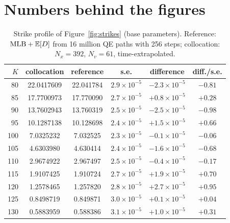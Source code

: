 \section{Numbers behind the figures}\label{app:tables}

\begin{table}[h]
\centering
\caption{Strike profile of Figure~\ref{fig:strikes} (base parameters). Reference: $\mathrm{MLB}+\mathbb{E}[D]$ from
16 million QE paths with 256 steps; collocation: $N_x=392$, $N_v=61$, time-extrapolated.}
\label{tab:strikes}
\small
\begin{tabular}{rccccc}
\toprule
$K$ & collocation & reference & s.e. & difference & diff./s.e.\\
\midrule
80 & 22.0417609 & 22.041784 & $2.9\times10^{-5}$ & $-2.3\times10^{-5}$ & $-0.81$\\
85 & 17.7700973 & 17.770090 & $2.7\times10^{-5}$ & $+0.8\times10^{-5}$ & $+0.28$\\
90 & 13.7602943 & 13.760319 & $2.5\times10^{-5}$ & $-2.5\times10^{-5}$ & $-0.98$\\
95 & 10.1287138 & 10.128698 & $2.4\times10^{-5}$ & $+1.5\times10^{-5}$ & $+0.66$\\
100 & 7.0325232 & 7.032525 & $2.3\times10^{-5}$ & $-0.1\times10^{-5}$ & $-0.06$\\
105 & 4.6303980 & 4.630414 & $2.4\times10^{-5}$ & $-1.6\times10^{-5}$ & $-0.68$\\
110 & 2.9674922 & 2.967497 & $2.5\times10^{-5}$ & $-0.4\times10^{-5}$ & $-0.17$\\
115 & 1.9107425 & 1.910724 & $2.7\times10^{-5}$ & $+1.9\times10^{-5}$ & $+0.70$\\
120 & 1.2578465 & 1.257820 & $2.8\times10^{-5}$ & $+2.7\times10^{-5}$ & $+0.95$\\
125 & 0.8498719 & 0.849871 & $3.0\times10^{-5}$ & $+0.1\times10^{-5}$ & $+0.04$\\
130 & 0.5883959 & 0.588386 & $3.1\times10^{-5}$ & $+1.0\times10^{-5}$ & $+0.31$\\
\bottomrule
\end{tabular}
\end{table}

